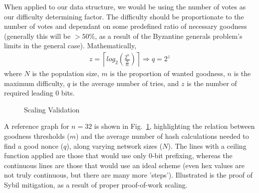 \documentclass[10pt]{IEEEtran}
\providecommand{\myceil}[1]{\left \lceil #1 \right \rceil }
\begin{document}
\par When applied to our data structure, we would be using the number of votes as our difficulty determining factor. The difficulty should be proportionate to the number of votes and dependant on some predefined ratio of necessary goodness (generally this will be $ > 50\%$, as a result of the Byzantine generals problem's limits in the general case). Mathematically,
\begin{gather}
z = \myceil{log_2{ (\frac{2^n}{\frac{N}{m}})}} \Rightarrow q = 2^z
\end{gather}
where $N$ is the population size, $m$ is the proportion of wanted goodness, $n$ is the maximum difficulty, $q$ is the average number of tries, and $z$ is the number of required leading $0$ bits.

\begin{figure}
\caption{Scaling Validation}
\label{fig_tryGraph}
\end{figure}

\par A reference graph for $n = 32$ is shown in Fig.~\ref{fig_tryGraph}, highlighting the relation between goodness thresholds ($m$) and the average number of hash calculations needed to find a good nonce ($q$), along varying network sizes ($N$). The lines with a ceiling function applied are those that would use only $0$-bit prefixing, whereas the continuous lines are those that would use an ideal scheme (even hex values are not truly continuous, but there are many more 'steps'). Illustrated is the proof of Sybil mitigation, as a result of proper proof-of-work scaling.
\end{document}

